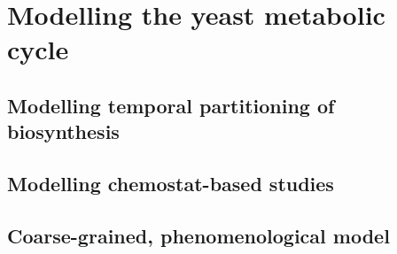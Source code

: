 \chapter{Modelling the yeast metabolic cycle}
\label{ch:model}

\section{Modelling temporal partitioning of biosynthesis}
\label{sec:model-temporal}

\section{Modelling chemostat-based studies}
\label{sec:model-chemostat}

\section{Coarse-grained, phenomenological model}
\label{sec:model-coarse}
